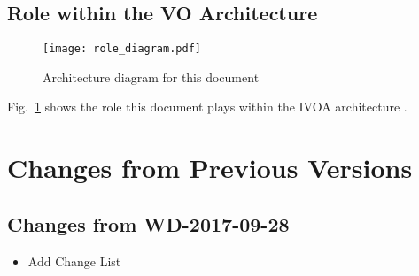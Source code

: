 \documentclass[11pt,a4paper]{ivoa}
\begin{document}
\pagebreak
\subsection{Role within the VO Architecture}

\begin{figure}[h]
\centering

\texttt{[image: role\_diagram.pdf]}
\caption{Architecture diagram for this document}
\label{fig:archdiag}
\end{figure}

Fig.~\ref{fig:archdiag} shows the role this document plays within the IVOA architecture \citep{2010ivoa.rept.1123A}.




\pagebreak
\appendix
\section{Changes from Previous Versions}


\subsection{Changes from WD-2017-09-28}
\begin{itemize}
  \item Add Change List
\end{itemize}



\pagebreak

\end{document}
